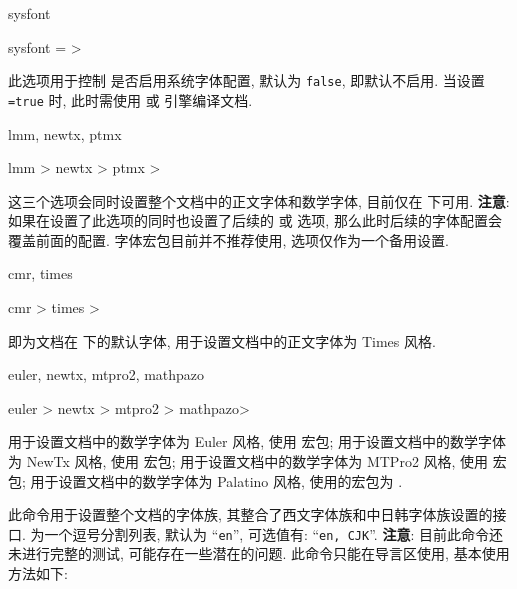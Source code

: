\begin{keyval}[parent=ztex/font]{sysfont}
  \begin{syntax}
    sysfont = >
  \end{syntax}
  此选项用于控制 \ztex{} 是否启用系统字体配置, 默认为 \texttt{false}, 即默认不启用.
  当设置 \texttt{=true} 时, 此时需使用  或  引擎编译文档.
\end{keyval}


\begin{keyval}[parent=ztex/font/doc]{lmm, newtx, ptmx}
  \begin{syntax}
    lmm   >\nval
    newtx >\nval 
    ptmx  >\nval
  \end{syntax}
  这三个选项会同时设置整个文档中的正文字体和数学字体, 目前仅在  下可用.
  \textbf{注意}: 如果在设置了此选项的同时也设置了后续的  或  选项, 
  那么此时后续的字体配置会覆盖前面的配置.  字体宏包目前并不推荐使用,  
  选项仅作为一个备用设置.
\end{keyval}



\begin{keyval}[parent=ztex/font/text]{cmr, times}
  \begin{syntax}
    cmr   >\nval
    times >\nval
  \end{syntax}
   即为文档在  下的默认字体,  用于设置文档中的正文字体为 Times 
  风格.
\end{keyval}


\begin{keyval}[parent=ztex/font/math]{euler, newtx, mtpro2, mathpazo}
  \begin{syntax}
    euler  >\nval
    newtx   >\nval
    mtpro2  >\nval
    mathpazo>\nval
  \end{syntax}
   用于设置文档中的数学字体为 Euler 风格, 使用  宏包;  用于设置文档中的数学字体为 NewTx 
  风格, 使用  宏包;  用于设置文档中的数学字体为 MTPro2 风格, 使用  宏包; 
   用于设置文档中的数学字体为 Palatino 风格, 使用的宏包为 .
\end{keyval}



\begin{function}[updated=2025-09-18]{\zfontfamilyset}
  \begin{syntax}
  \end{syntax}
  此命令用于设置整个文档的字体族, 其整合了西文字体族和中日韩字体族设置的接口.
   为一个逗号分割列表, 默认为 ``\texttt{en}'', 可选值有: ``\texttt{en, CJK}''.
  \textbf{注意}: 目前此命令还未进行完整的测试, 可能存在一些潜在的问题.
  此命令只能在导言区使用, 基本使用方法如下:
\end{function}

